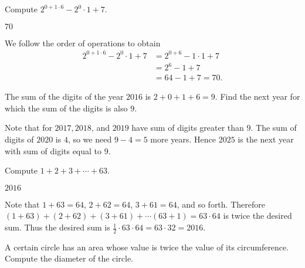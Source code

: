 \documentclass[11pt]{article}
\begin{document}
\begin{problem}
Compute $2^{0 + 1 \cdot 6} - 2^0 \cdot 1 + 7$.
\end{problem}

\begin{answer}
$\boxed{70}$
\end{answer}

\begin{solution}
We follow the order of operations to obtain \begin{align*} 2^{0 + 1 \cdot 6} - 2^0 \cdot 1 + 7 &= 2^{0 + 6} - 1 \cdot 1 + 7 \\ &= 2^6 - 1 + 7 \\ &= 64 - 1 + 7 = \boxed{70}. \end{align*}
\end{solution}


\begin{problem}
The sum of the digits of the year $2016$ is $2 + 0 + 1 + 6 = 9$. Find the next year for which the sum of the digits is also $9$.
\end{problem}

\begin{answer}
\end{answer}

\begin{solution}
Note that for $2017, 2018$, and $2019$ have sum of digits greater than $9$. The sum of digits of $2020$ is $4$, so we need $9-4 = 5$ more years. Hence $\boxed{2025}$ is the next year with sum of digits equal to $9$.
\end{solution}


\begin{problem}
Compute $1 + 2 + 3 + \cdots +  63$. 
\end{problem}

\begin{answer}
$\boxed{2016}$
\end{answer}

\begin{solution}
Note that $1 + 63 = 64$, $2 + 62 = 64$, $3 + 61 = 64$, and so forth. Therefore $(1 + 63) + (2 + 62) + (3 + 61) + \cdots (63 + 1) = 63 \cdot 64$ is twice the desired sum. Thus the desired sum is $\frac{1}{2} \cdot 63 \cdot 64 = 63 \cdot 32 = \boxed{2016}$.
\end{solution}


\begin{problem}%
A certain circle has an area whose value is twice the value of its circumference. Compute the diameter of the circle.
\end{problem}
\end{document}
